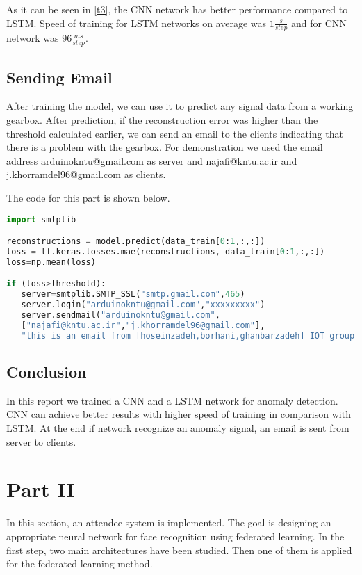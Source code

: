 As it can be seen in \ref{t3}, the CNN network has better performance compared to LSTM. Speed of training for LSTM networks on average was $1 \frac{s}{step}$ and for CNN network was $96 \frac{ms}{step}$.

\subsection*{Sending Email}

After training the model, we can use it to predict any signal data from a working gearbox. After prediction, if the reconstruction error was higher than the threshold calculated earlier, we can send an email to the clients indicating that there is a problem with the gearbox. 
For demonstration we used the email address arduinokntu@gmail.com as server and najafi@kntu.ac.ir and j.khorramdel96@gmail.com as clients.

The code for this part is shown below.

\begin{center}{\begin{minipage}{0.9\linewidth}
\begin{lstlisting}[language=Python, basicstyle=\fontsize{10}{10}\selectfont\ttfamily]
import smtplib

reconstructions = model.predict(data_train[0:1,:,:])
loss = tf.keras.losses.mae(reconstructions, data_train[0:1,:,:])
loss=np.mean(loss)

if (loss>threshold):
   server=smtplib.SMTP_SSL("smtp.gmail.com",465)
   server.login("arduinokntu@gmail.com","xxxxxxxxx")
   server.sendmail("arduinokntu@gmail.com", 
   ["najafi@kntu.ac.ir","j.khorramdel96@gmail.com"], 
   "this is an email from [hoseinzadeh,borhani,ghanbarzadeh] IOT group.")
\end{lstlisting}
\end{minipage}}\end{center}

\subsection*{Conclusion}

In this report we trained a CNN and a LSTM network for anomaly detection. CNN can achieve better results with higher speed of training in comparison with LSTM. At the end if network recognize an anomaly signal, an email is sent from server to clients.

\newpage
\section*{Part II}
In this section, an attendee system is implemented. The goal is designing an appropriate neural network for face recognition using federated learning. In the first step, two main architectures have been studied. Then one of them is applied for the federated learning method.

